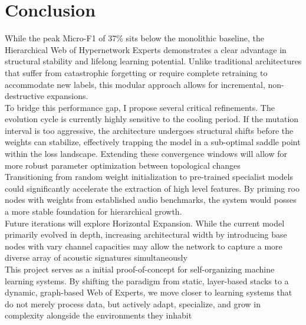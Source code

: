 \documentclass{article}
\begin{document}
\section{Conclusion}

While the peak Micro-F1 of 37\% sits below the monolithic baseline, the Hierarchical Web of Hypernetwork Experts demonstrates a clear advantage in structural stability and lifelong learning potential. Unlike traditional architectures that suffer from catastrophic forgetting or require complete retraining to accommodate new labels, this modular approach allows for incremental, non-destructive expansions.\\

\noindent To bridge this performance gap, I propose several critical refinements. The evolution cycle is currently highly sensitive to the cooling period. If the mutation interval is too aggressive, the architecture undergoes structural shifts before the weights can stabilize, effectively trapping the model in a sub-optimal saddle point within the loss landscape. Extending these convergence windows will allow for more robust parameter optimization between topological changes\\

\noindent Transitioning from random weight initialization to pre-trained specialist models could significantly accelerate the extraction of high level features. By priming roo nodes with weights from established audio benchmarks, the system would posses a more stable foundation for hierarchical growth. \\

\noindent Future iterations will explore Horizontal Expansion. While the current model primarily evolved in depth, increasing architectural width by introducing base nodes with vary channel capacities may allow the network to capture a more diverse array of acoustic signatures simultaneously \\

\noindent This project serves as a initial proof-of-concept for self-organizing machine learning systems. By shifting the paradigm from static, layer-based stacks to a dynamic, graph-based Web of Experts, we move closer to learning systems that do not merely process data, but actively adapt, specialize, and grow in complexity alongside the environments they inhabit
\\

\medskip

\printbibliography
\end{document}

